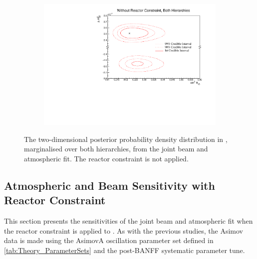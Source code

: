 \begin{figure}[h]
  \begin{subfigure}[t]{0.98\textwidth}
    \includegraphics[width=\textwidth, trim={0mm 0mm 0mm 0mm}, clip,page=1]{Figures/OA/JointFit/Contours_2D_th13_dm32_BH_0_woRC_UnSmeared_CredibleInterval.pdf}
  \end{subfigure}
  \caption{The two-dimensional posterior probability density distribution in , marginalised over both hierarchies, from the joint beam and atmospheric fit. The reactor constraint is not applied.}
  \label{fig:OscillationAnalysis_JointFit_DM32TH13}
\end{figure}

\clearpage
\subsection{Atmospheric and Beam Sensitivity with Reactor Constraint}
\label{sec:OscillationAnalysis_JointFit_wRC}

This section presents the sensitivities of the joint beam and atmospheric fit when the reactor constraint is applied to . As with the previous studies, the Asimov data is made using the AsimovA oscillation parameter set defined in \autoref{tab:Theory_ParameterSets} and the post-BANFF systematic parameter tune.
  
